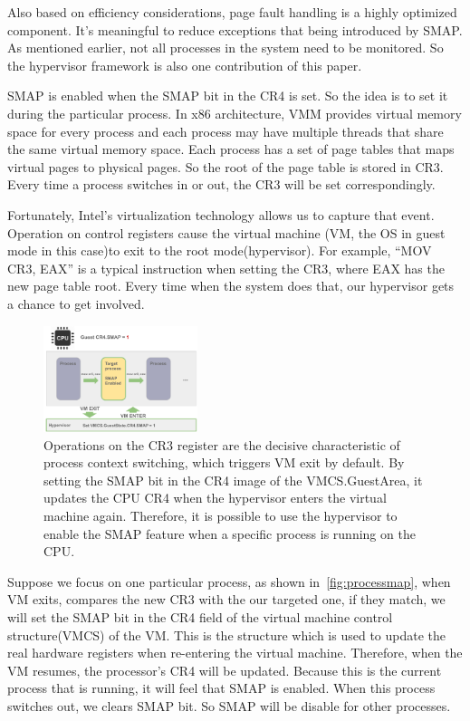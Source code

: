 Also based on efficiency considerations, page fault handling is a highly optimized component. It's meaningful to reduce exceptions that being introduced by SMAP. As mentioned earlier, not all processes in the system need to be monitored. So the hypervisor framework is also one contribution of this paper. 

SMAP is enabled when the SMAP bit in the CR4 is set. So the idea is to set it during the particular process. In x86 architecture, VMM provides virtual memory space for every process and each process may have multiple threads that share the same virtual memory space. Each process has a set of page tables that maps virtual pages to physical pages. So the root of the page table is stored in CR3. Every time a process switches in or out, the CR3 will be set correspondingly.

Fortunately, Intel's virtualization technology allows us to capture that event. Operation on control registers cause the virtual machine (VM, the OS in guest mode in this case)to exit to the root mode(hypervisor). For example, ``MOV CR3, EAX'' is a typical instruction when setting the CR3, where EAX has the new page table root. Every time when the system does that, our hypervisor gets a chance to get involved.

\begin{figure}[th]
  \includegraphics[width=0.40\textwidth]{figures/processmap3}
  \centering
  \caption{Operations on the CR3 register are the decisive characteristic of process context switching, which triggers VM exit by default. By setting the SMAP bit in the CR4 image of the VMCS.GuestArea, it updates the CPU CR4 when the hypervisor enters the virtual machine again. Therefore, it is possible to use the hypervisor to enable the SMAP feature when a specific process is running on the CPU.}
  \label{fig:processmap}
\end{figure}

Suppose we focus on one particular process, as shown in~\autoref{fig:processmap}, when VM exits, compares the new CR3 with the our targeted one, if they match, we will set the SMAP bit in the CR4 field of the virtual machine control structure(VMCS) of the VM. This is the structure which is used to update the real hardware registers when re-entering the virtual machine. Therefore, when the VM resumes, the processor's CR4 will be updated. Because this is the current process that is running, it will feel that SMAP is enabled. When this process switches out, we clears SMAP bit. So SMAP will be disable for other processes.

